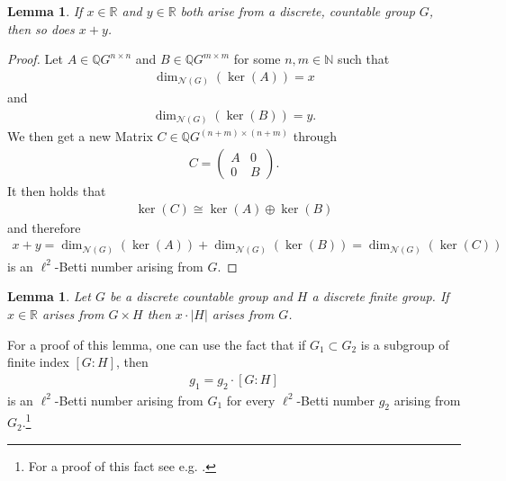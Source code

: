 \documentclass[12pt,a4paper]{scrartcl}
\theoremstyle{plain}
\newtheorem{Lemma}[Theorem]{Lemma}
\theoremstyle{definition}
\newcommand{\R}{\mathbb{R}} %
\newcommand{\Q}{\mathbb{Q}} %
\newcommand{\N}{\mathbb{N}} %
\newcommand{\2}{\mathbb{Z} / 2 \mathbb{Z}}
\newcommand{\1}{\bar{1}}
\newcommand{\0}{\bar{0}}
\begin{document}
\begin{Lemma}\label{add}
	If $x \in \R$ and $y \in \R$ both arise from a discrete, countable group $G$, then so does $x + y$.
\end{Lemma}
\begin{proof}
	Let $A \in \Q G^{n \times n}$ and $B \in \Q G^{m \times m}$ for some $n, m \in \N$ such that 
	\begin{align*}
		\dim_{\mathcal{N}(G)}(\ker (A))=x
	\end{align*}
	and
	\begin{align*}
		\dim_{\mathcal{N}(G)}(\ker (B))=y.
	\end{align*}
	We then get a new Matrix $C \in \Q G^{(n+m) \times (n+m)}$ through
	\begin{align*}
		C = \begin{pmatrix}
		A & 0 \\
		0 & B
		\end{pmatrix}.
	\end{align*}
	It then holds that
	\begin{align*}
		\ker(C) \cong \ker(A) \oplus \ker (B)
	\end{align*}
	and therefore
	\begin{align*}
		x + y = \dim_{\mathcal{N}(G)}(\ker (A))+\dim_{\mathcal{N}(G)}(\ker (B)) = \dim_{\mathcal{N}(G)}(\ker (C))
	\end{align*}
	is an $\ell^2$-Betti number arising from $G$.
\end{proof}
\begin{Lemma}\label{mult}
	Let $G$ be a discrete countable group and $H$ a discrete finite group. If $x \in \R$ arises from $G \times H$ then $x \cdot |H|$ arises from $G$.
\end{Lemma}
For a proof of this lemma, one can use the fact that if $G_1 \subset G_2$ is a subgroup of finite index $[G : H]$, then
\begin{align*}
	g_1 = g_2 \cdot [G : H]
\end{align*}
is an $\ell^2$-Betti number arising from $G_1$ for every $\ell^2$-Betti number $g_2$ arising from $G_2$.\footnote{For a proof of this fact see e.g. \cite[p.38]{LUECK}.}
\end{document}
